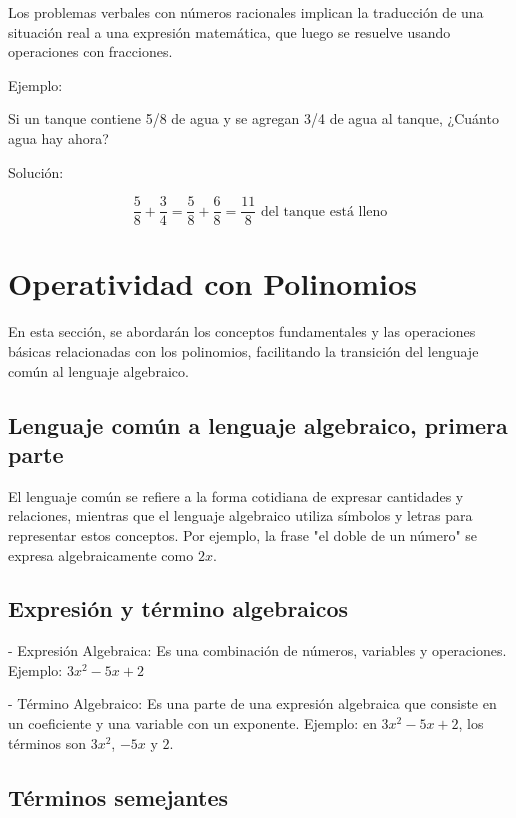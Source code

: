 Los problemas verbales con números racionales implican la traducción de una situación real a una expresión matemática, que luego se resuelve usando operaciones con fracciones.

Ejemplo:

Si un tanque contiene 5/8 de agua y se agregan 3/4 de agua al tanque, ¿Cuánto agua hay ahora?

Solución:

\[
\frac{5}{8} + \frac{3}{4} = \frac{5}{8} + \frac{6}{8} = \frac{11}{8} \text{ del tanque está lleno}
\]






\section{Operatividad con Polinomios}%

En esta sección, se abordarán los conceptos fundamentales y las operaciones básicas relacionadas con los polinomios, facilitando la transición del lenguaje común al lenguaje algebraico.

\subsection{Lenguaje común a lenguaje algebraico, primera parte}

El lenguaje común se refiere a la forma cotidiana de expresar cantidades y relaciones, mientras que el lenguaje algebraico utiliza símbolos y letras para representar estos conceptos. Por ejemplo, la frase "el doble de un número" se expresa algebraicamente como \(2x\).

\subsection{Expresión y término algebraicos}

- Expresión Algebraica: Es una combinación de números, variables y operaciones. Ejemplo: \(3x^2 - 5x + 2\)

- Término Algebraico: Es una parte de una expresión algebraica que consiste en un coeficiente y una variable con un exponente. Ejemplo: en \(3x^2 - 5x + 2\), los términos son \(3x^2\), \(-5x\) y \(2\).

\subsection{Términos semejantes}

